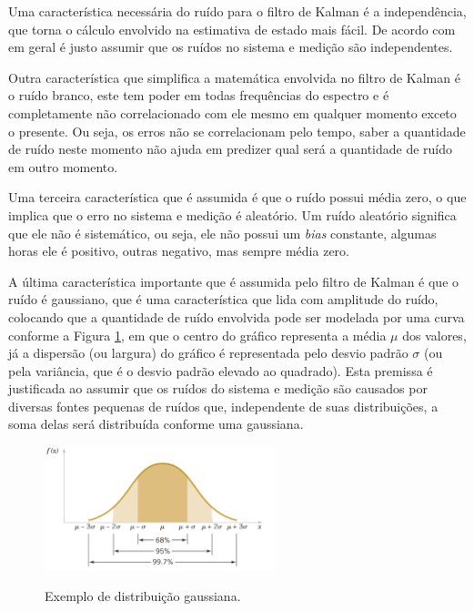 \documentclass[acronym, symbols, table]{fei}
\begin{document}
				Uma característica necessária do ruído para o filtro de Kalman é a independência, que torna o cálculo envolvido na estimativa de estado mais fácil. De acordo com \textcite{phdthesisNegenborn} em geral é justo assumir que os ruídos no sistema e medição são independentes.
				
				Outra característica que simplifica a matemática envolvida no filtro de Kalman é o ruído branco, este tem poder em todas frequências do espectro e é completamente não correlacionado com ele mesmo em qualquer momento exceto o presente. Ou seja, os erros não se correlacionam pelo tempo, saber a quantidade de ruído neste momento não ajuda em predizer qual será a quantidade de ruído em outro momento.
				
				Uma terceira característica que é assumida é que o ruído possui média zero, o que implica que o erro no sistema e medição é aleatório. Um ruído aleatório significa que ele não é sistemático, ou seja, ele não possui um \textit{bias} constante, algumas horas ele é positivo, outras negativo, mas sempre média zero.
				
				A última característica importante que é assumida pelo filtro de Kalman é que o ruído é gaussiano, que é uma característica que lida com amplitude do ruído, colocando que a quantidade de ruído envolvida pode ser modelada por uma curva conforme a Figura \ref{fig:distribuicao_gaussiana}, em que o centro do gráfico representa a média $\mu$ dos valores, já a dispersão (ou largura) do gráfico é representada pelo desvio padrão $\sigma$ (ou pela variância, que é o desvio padrão elevado ao quadrado). Esta premissa é justificada ao assumir que os ruídos do sistema e medição são causados por diversas fontes pequenas de ruídos que, independente de suas distribuições, a soma delas será distribuída conforme uma gaussiana.
				
				\begin{figure}[!htb]
					\centering
					\caption{Exemplo de distribuição gaussiana.} 
					\includegraphics[width=0.6\textwidth]{distribuicao_gaussiana.png}
					\label{fig:distribuicao_gaussiana}
				\end{figure}
			
\end{document}
